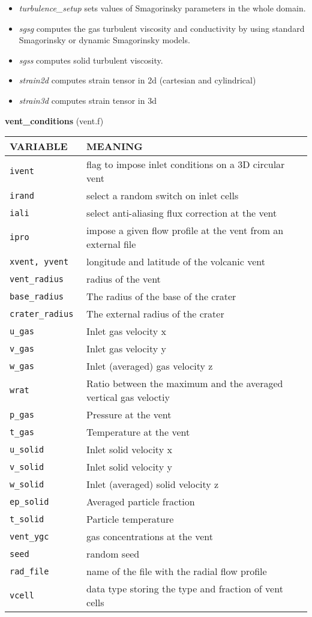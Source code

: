 \begin{itemize}
\item{\em turbulence\_setup} sets values of Smagorinsky parameters in the whole domain.
\item{\em sgsg} computes the gas turbulent viscosity and conductivity by using standard Smagorinsky
or dynamic Smagorinsky models.
\item{\em sgss} computes solid turbulent viscosity.
\item{\em strain2d} computes strain tensor in 2d (cartesian and cylindrical)
\item{\em strain3d} computes strain tensor in 3d
\end{itemize}
%
%
{\large{\bf vent\_conditions}} (vent.f)\\[5mm]
\begin{tabular}{|p{6cm}|p{6cm}|}\hline
VARIABLE & MEANING \\ \hline
\tt ivent & flag to impose inlet conditions on a 3D circular vent \\\hline
\tt irand & select a random switch on inlet cells\\\hline
\tt iali & select anti-aliasing flux correction at the vent\\\hline
\tt ipro & impose a given flow profile at the vent from an external file\\\hline
\tt xvent, yvent & longitude and latitude of the volcanic vent\\\hline
\tt vent\_radius & radius of the vent\\\hline
\tt base\_radius & The radius of the base of the crater\\\hline
\tt crater\_radius & The external radius of the crater\\\hline
\tt u\_gas & Inlet gas velocity x\\\hline
\tt v\_gas & Inlet gas velocity y\\\hline
\tt w\_gas & Inlet (averaged) gas velocity z\\\hline
\tt wrat & Ratio between the maximum and the averaged vertical gas veloctiy\\\hline
\tt p\_gas & Pressure at the vent\\\hline
\tt t\_gas & Temperature at the vent\\\hline
\tt u\_solid & Inlet solid velocity x\\\hline
\tt v\_solid & Inlet solid velocity y\\\hline
\tt w\_solid & Inlet (averaged) solid velocity z\\\hline
\tt ep\_solid & Averaged particle fraction\\\hline
\tt t\_solid & Particle temperature\\\hline
\tt vent\_ygc & gas concentrations at the vent\\\hline
\tt seed & random seed \\\hline
\tt rad\_file & name of the file with the radial flow profile\\\hline
\tt vcell & data type storing the type and fraction of vent cells\\\hline
\end{tabular}
